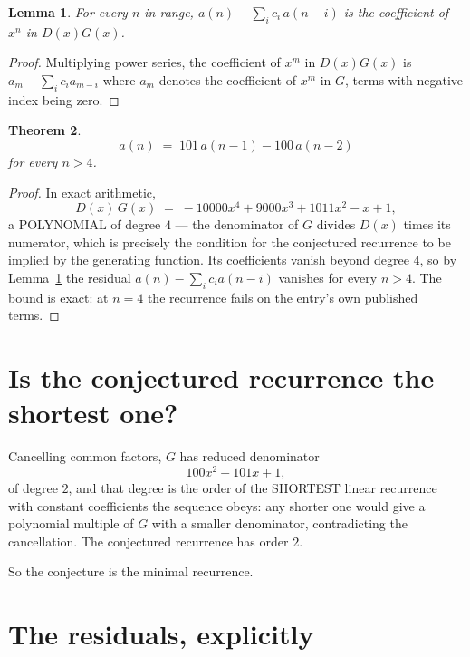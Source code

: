 \documentclass[11pt,a4paper]{article}
\theoremstyle{plain}
\newtheorem{theorem}{Theorem}
\newtheorem{lemma}[theorem]{Lemma}
\theoremstyle{definition}
\begin{document}
\begin{lemma}\label{lem:key}
For every $n$ in range, $a(n)-\sum_i c_i\,a(n-i)$ is the coefficient of $x^{n}$ in
$D(x)G(x)$.
\end{lemma}

\begin{proof}
Multiplying power series, the coefficient of $x^{m}$ in $D(x)G(x)$ is
$a_m-\sum_i c_i a_{m-i}$ where $a_m$ denotes the coefficient of $x^{m}$ in $G$, terms with
negative index being zero.
\end{proof}

\begin{theorem}
\[
a(n)\;=\;101\,a(n-1) - 100\,a(n-2)
\]
for every $n>4$.
\end{theorem}

\begin{proof}
In exact arithmetic,
\[
D(x)\,G(x)\;=\;- 10000 x^{4} + 9000 x^{3} + 1011 x^{2} - x + 1,
\]
a POLYNOMIAL of degree $4$ --- the denominator of $G$ divides $D(x)$ times its numerator,
which is precisely the condition for the conjectured recurrence to be implied by the
generating function. Its coefficients vanish beyond degree $4$, so by
Lemma~\ref{lem:key} the residual $a(n)-\sum_ic_ia(n-i)$ vanishes for every
$n>4$. The bound is exact: at $n=4$ the recurrence fails on the entry's own published terms.
\end{proof}

\section{Is the conjectured recurrence the shortest one?}

Cancelling common factors, $G$ has reduced denominator
\[
100 x^{2} - 101 x + 1,
\]
of degree $2$, and that degree is the order of the SHORTEST linear recurrence with
constant coefficients the sequence obeys: any shorter one would give a polynomial multiple of
$G$ with a smaller denominator, contradicting the cancellation. The conjectured recurrence has
order $2$.

So the conjecture is the minimal recurrence.

\section{The residuals, explicitly}
\end{document}
